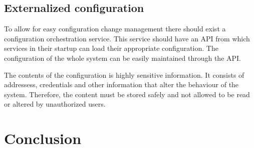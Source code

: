 \subsection{Externalized configuration}
\begin{sloppypar}
    To allow for easy configuration change management there should exist a 
    configuration orchestration service. This service should have an API from 
    which services in their startup can load their appropriate configuration. 
    The configuration of the whole system can be easily maintained through the 
    API.

    The contents of the configuration is highly sensitive information. It 
    consists of addressess, credentials and other information that alter 
    the behaviour of the system. Therefore, the content must be stored safely 
    and not allowed to be read or altered by unauthorized users.
\end{sloppypar}





\section{Conclusion}




